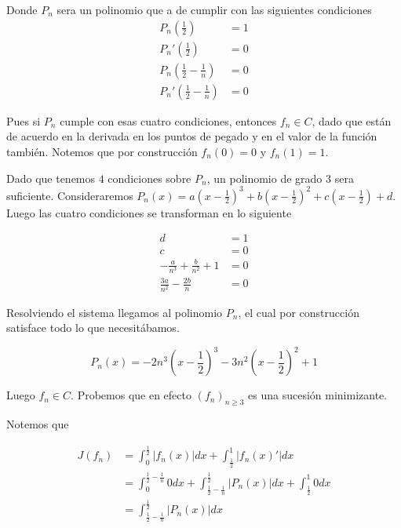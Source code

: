 \documentclass[a4paper,oneside,10.5pt]{USMArt}
\begin{document}
\begin{sol}
\begin{enumerate}
    Donde $P_{n}$ sera un polinomio que a de cumplir con las siguientes condiciones
    \begin{align*}
      P_{n}(\frac12) &= 1\\
      P_{n}'(\frac12) &= 0\\
      P_{n}(\frac12 - \frac1n) &= 0\\
      P_{n}'(\frac12 - \frac1n) &= 0
    \end{align*}

    Pues si $P_{n}$ cumple con esas cuatro condiciones, entonces $f_{n} \in C$, dado que están
    de acuerdo en la derivada en los puntos de pegado y en el valor de la función también.
    Notemos que por construcción $f_{n}(0) = 0$ y $f_{n}(1) = 1$.

    Dado que tenemos $4$ condiciones sobre $P_{n}$, un polinomio de grado $3$ sera suficiente.
    Consideraremos $P_{n}(x) = a(x - \frac12)^{3} + b(x - \frac12)^{2} + c(x - \frac12) + d$.
    Luego las cuatro condiciones se transforman en lo siguiente

    \begin{align*}
       d &= 1\\
       c &= 0\\
       -\frac{a}{n^{3}} + \frac{b}{n^{2}} + 1 &= 0\\
       \frac{3a}{n^{2}} - \frac{2b}{n} &= 0
    \end{align*}

    Resolviendo el sistema llegamos al polinomio $P_{n}$, el cual por construcción satisface todo lo que necesitábamos.

    \begin{equation*}
      P_{n}(x) = -2n^{3}(x - \frac12)^{3} - 3n^{2}(x - \frac12)^{2} + 1
    \end{equation*}

    Luego $f_{n} \in C$. Probemos que en efecto $(f_{n})_{n \geq 3}$ es una sucesión minimizante.

    Notemos que

    \begin{align*}
      J(f_{n}) &= \int_{0}^{\frac{1}{2}} |f_{n}(x)| dx + \int_{\frac12}^{1} |f_{n}(x)'|dx\\
               &= \int_{0}^{\frac12 - \frac1n} 0 dx + \int_{\frac12 - \frac1n}^{\frac12} |P_{n}(x)| dx + \int_{\frac12}^{1} 0 dx\\
               &= \int_{\frac12 - \frac1n}^{\frac12} |P_{n}(x)| dx
    \end{align*}


\end{enumerate}
\end{sol}
\end{document}
